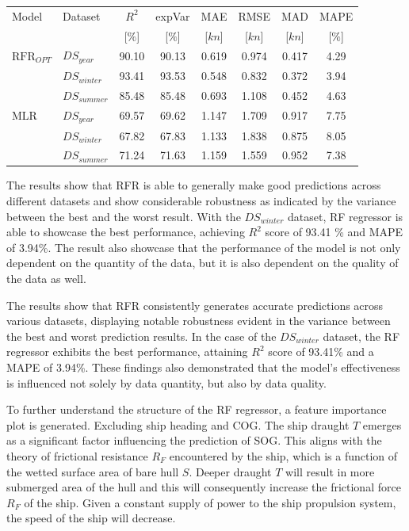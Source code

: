 \documentclass[]{interact}
\theoremstyle{plain}%
\theoremstyle{definition}
\theoremstyle{remark}
\begin{document}
\begin{table}
  {\begin{tabular}{ l l c c c c c c }
  \hline
  Model & Dataset & $R^2$ & expVar & MAE & RMSE & MAD & MAPE \\
  & & [$\%$] & [$\%$] & [$kn$] & [$kn$] & [$kn$] & [$\%$]  \\ 
  \hline
  $\text{RFR}_{OPT}$ & $DS_{year}$  & 90.10 & 90.13 & 0.619 & 0.974 & 0.417 & 4.29 \\
  & $DS_{winter}$ & 93.41 & 93.53 & 0.548 & 0.832 & 0.372 & 3.94 \\
  & $DS_{summer}$ & 85.48 & 85.48 & 0.693 & 1.108 & 0.452 & 4.63 \\
  MLR & $DS_{year}$ & 69.57 & 69.62 & 1.147 & 1.709 & 0.917 & 7.75 \\
  & $DS_{winter}$ & 67.82 & 67.83 & 1.133 & 1.838 & 0.875 & 8.05 \\
  & $DS_{summer}$ & 71.24 & 71.63 & 1.159 & 1.559 & 0.952 & 7.38 \\
  \hline
  \end{tabular}}
\label{tbl:testing_dataset_sog_result}
\end{table}

The results show that RFR is able to generally make good predictions across different datasets and show considerable robustness as indicated by the variance between the best and the worst result. With the $DS_{winter}$ dataset, RF regressor is able to showcase the best performance, achieving $R^2$ score of 93.41 \% and MAPE of 3.94\%. The result also showcase that the performance of the model is not only dependent on the quantity of the data, but it is also dependent on the quality of the data as well.

The results show that RFR consistently generates accurate predictions across various datasets, displaying notable robustness evident in the variance between the best and worst prediction results. In the case of the $DS_{winter}$ dataset, the RF regressor exhibits the best performance, attaining $R^2$ score of 93.41\% and a MAPE of 3.94\%. These findings also demonstrated that the model's effectiveness is influenced not solely by data quantity, but also by data quality.

To further understand the structure of the RF regressor, a feature importance plot is generated. Excluding ship heading and COG. The ship draught $T$ emerges as a significant factor influencing the prediction of SOG. This aligns with the theory of frictional resistance $R_F$ encountered by the ship, which is a function of the wetted surface area of bare hull $S$. Deeper draught $T$ will result in more submerged area of the hull and this will consequently increase the frictional force $R_F$ of the ship. Given a constant supply of power to the ship propulsion system, the speed of the ship will decrease.
\end{document}
